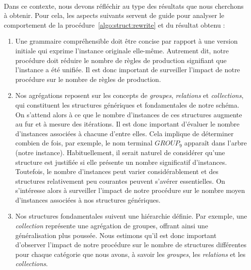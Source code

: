 \paragraph{}
Dans ce contexte, nous devons réfléchir au type des résultats que nous cherchons à obtenir.
Pour cela, les aspects suivants servent de guide pour analyser le comportement de la procédure~\ref{algo:struct:rewrite} et du résultat obtenu :
\begin{enumerate}
    \item \label{asp1} Une grammaire compréhensible doit être concise par rapport à une version initiale qui exprime l'instance originale elle-même.
    Autrement dit, notre procédure doit réduire le nombre de règles de production signifiant que l'instance a été unifiée.
    Il est donc important de surveiller l'impact de notre procédure sur le nombre de règles de production.

    \item \label{asp2} Nos agrégations reposent sur les concepts de \emph{groupes}, \emph{relations} et \emph{collections}, qui constituent les structures génériques et fondamentales de notre schéma.
    On s'attend alors à ce que le nombre d'instances de ces structures augmente au fur et à mesure des itérations.
    Il est donc important d'évaluer le nombre d'instances associées à chacune d'entre elles.
    Cela implique de déterminer combien de fois, par exemple, le nom terminal $GROUP_9$ apparaît dans l'arbre (notre instance).
    Habituellement, il serait naturel de considérer qu'une structure est justifiée si elle présente un nombre significatif d'instances.
    Toutefois, le nombre d'instances peut varier considérablement et des structures relativement peu courantes peuvent s'avérer essentielles.
    On s'intéresse alors à surveiller l'impact de notre procédure sur le nombre moyen d'instances associées à nos structures génériques.
    
    \item\label{asp3} Nos structures fondamentales suivent une hiérarchie définie.
    Par exemple, une \emph{collection} représente une agrégation de groupes, offrant ainsi une généralisation plus poussée.
    Nous estimons qu'il est donc important d'observer l'impact de notre procédure sur le nombre de structures différentes pour chaque catégorie que nous avons, à savoir les \emph{groupes}, les \emph{relations} et les \emph{collections}.
\end{enumerate}

